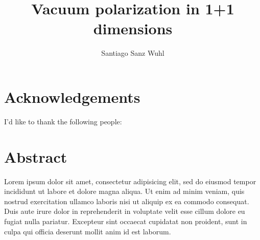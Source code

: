 \documentclass[a4paper,palatino,11pt,twoside]{thesis}
\title{Vacuum polarization in 1+1 dimensions}
\author{Santiago Sanz Wuhl}
\begin{document}
    \startpreamble
    
    
    \section*{Acknowledgements}
    I'd like to thank the following people:
    
    \newpage
    \section*{Abstract}
    Lorem ipsum dolor sit amet, consectetur adipisicing elit, sed do eiusmod tempor incididunt ut labore et dolore magna aliqua. Ut enim ad minim veniam, quis nostrud exercitation ullamco laboris nisi ut aliquip ex ea commodo consequat. Duis aute irure dolor in reprehenderit in voluptate velit esse cillum dolore eu fugiat nulla pariatur. Excepteur sint occaecat cupidatat non proident, sunt in culpa qui officia deserunt mollit anim id est laborum.
    
    \tableofcontents
    \listoffigures
    \listoftables
    
    \cleardoublepage
    \markboth{\nomname}{\nomname}
    
    \printnomenclature[2cm]
    
    \stoppreamble
    
    

    
    
    

    \appendix
    
    
    


    
    
\end{document}
